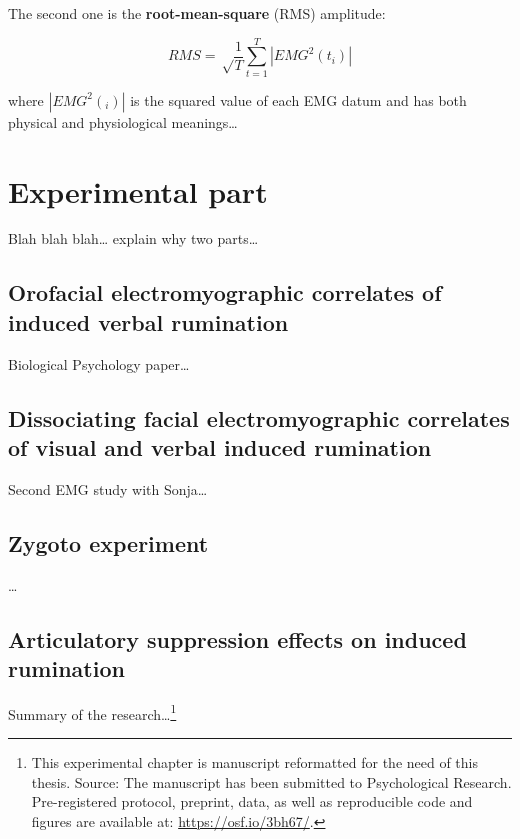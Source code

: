 \documentclass[12pt,]{book}
\let\rmarkdownfootnote\footnote%
\def\footnote{\protect\rmarkdownfootnote}
\begin{document}
The second one is the \textbf{root-mean-square} (RMS) amplitude:

\[RMS = \sqrt \frac{1}{T} \sum_{t=1}^{T} | EMG^{2}(t_{i}) |\]

where \(|EMG^{2}(_{i})|\) is the squared value of each EMG datum and has
both physical and physiological meanings\ldots{}

\part{Experimental part}\label{part-experimental-part}

Blah blah blah\ldots{} explain why two parts\ldots{}

\chapter{Orofacial electromyographic correlates of induced verbal
rumination}\label{orofacial-electromyographic-correlates-of-induced-verbal-rumination}

Biological Psychology paper\ldots{}

\chapter{Dissociating facial electromyographic correlates of visual and
verbal induced
rumination}\label{dissociating-facial-electromyographic-correlates-of-visual-and-verbal-induced-rumination}

Second EMG study with Sonja\ldots{}

\chapter{Zygoto experiment}\label{zygoto-experiment}

\ldots{}

\chapter{Articulatory suppression effects on induced
rumination}\label{articulatory-suppression-effects-on-induced-rumination}

Summary of the research\ldots{}\footnote{This experimental chapter is
  manuscript reformatted for the need of this thesis. Source: The
  manuscript has been submitted to Psychological Research.
  Pre-registered protocol, preprint, data, as well as reproducible code
  and figures are available at: \url{https://osf.io/3bh67/}.}
\end{document}
